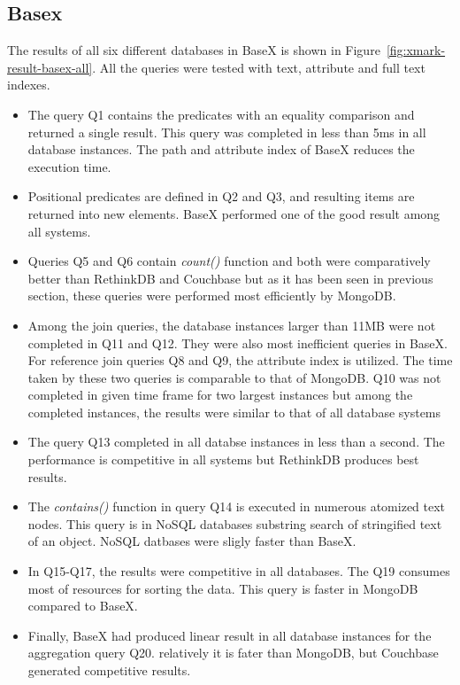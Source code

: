 \subsection{Basex}
The results of all six different databases in BaseX is shown in Figure~\ref{fig:xmark-result-basex-all}. All the queries were tested with text, attribute and full text indexes. 
\begin{itemize}
\item The query Q1 contains the predicates with an equality comparison and returned a single result. This query was completed in less than 5ms in all database instances.  The path and attribute index of BaseX reduces the execution time.

\item Positional predicates are defined in Q2 and Q3, and resulting items are returned into new elements. BaseX performed one of the good result among all systems. 

\item Queries Q5 and Q6 contain \textit{count()} function and both were comparatively better than RethinkDB and Couchbase but as it has been seen in previous section, these queries were performed most efficiently by MongoDB.
\item 
Among the join queries, the database instances larger than 11MB were not completed in Q11 and Q12. They were also most inefficient queries in BaseX.  For reference join queries Q8 and Q9, the attribute index is utilized. The time taken by these two queries is comparable to that of MongoDB. Q10 was not completed in given time frame for two largest instances but among the completed instances, the results were similar to that of all database systems 
\item The query Q13 completed in all databse instances in less than a second. The performance is competitive in all systems but RethinkDB produces best results. 
\item  The \textit{contains()} function in query Q14 is executed in numerous atomized text nodes. This query is in NoSQL databases substring search of stringified text of an object. NoSQL datbases were sligly faster than BaseX. 

\item In Q15-Q17, the results were competitive in all databases. The Q19 consumes most of resources for sorting the data. This query is faster in MongoDB compared to BaseX.

\item Finally, BaseX  had produced linear result in all database instances for the aggregation query Q20. relatively it is fater than MongoDB, but Couchbase generated competitive results. 
\end{itemize}

